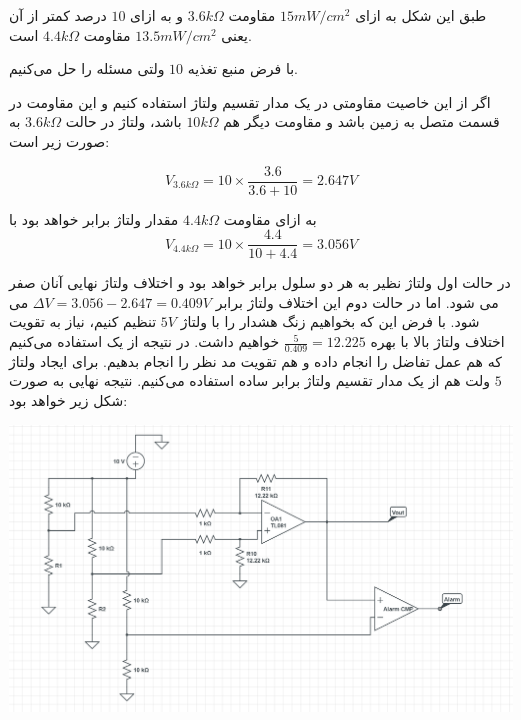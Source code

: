 \documentclass[12pt]{article}
\begin{document}
طبق این شکل به ازای $15mW/cm^2$ مقاومت $3.6k\Omega$ و به ازای $10$ درصد کمتر از آن یعنی $13.5mW/cm^2$ مقاومت $4.4k\Omega$ است.

با فرض منبع تغذیه $10$ ولتی مسئله را حل می‌کنیم.

اگر از این خاصیت مقاومتی در یک مدار تقسیم ولتاژ استفاده کنیم و این مقاومت در قسمت متصل به زمین باشد و مقاومت دیگر هم $10k\Omega$ باشد، ولتاژ در حالت $3.6k\Omega$ به صورت زیر است:

$$V_{3.6k\Omega} = 10 \times \frac{3.6}{3.6+10} = 2.647 V$$

 به ازای مقاومت $4.4k\Omega$ مقدار ولتاژ برابر خواهد بود با
 $$V_{4.4k\Omega} = 10 \times \frac{4.4}{10+4.4} = 3.056V$$
 
 در حالت اول ولتاژ نظیر به هر دو سلول برابر خواهد بود و اختلاف ولتاژ نهایی آنان صفر می شود. اما در حالت دوم این اختلاف ولتاژ برابر
 $\Delta V = 3.056 - 2.647 = 0.409V$
 می شود. با فرض این که بخواهیم زنگ هشدار را با ولتاژ $5V$ تنظیم کنیم، نیاز به تقویت اختلاف ولتاژ بالا با بهره
 $\frac{5}{0.409}=12.225$
 خواهیم داشت. در نتیجه از یک   
 استفاده می‌کنیم که هم عمل تفاضل را انجام داده و هم تقویت مد نظر را انجام بدهیم. برای ایجاد ولتاژ $5$ ولت هم از یک مدار تقسیم ولتاژ برابر ساده استفاده می‌کنیم. نتیجه نهایی به صورت شکل زیر خواهد بود:
 
   
 \begin{center}
 	\includegraphics[width = 0.5 \textwidth]{images/22-2.png}
 \end{center}
 
 
\end{document}
